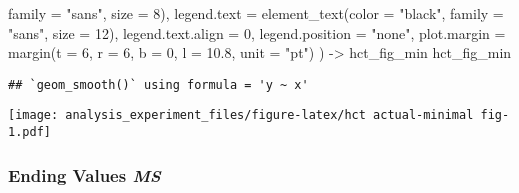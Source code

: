 \documentclass[
]{article}
\newenvironment{Shaded}{\begin{snugshade}}{\end{snugshade}}
\newcommand{\AttributeTok}[1]{\textcolor[rgb]{0.77,0.63,0.00}{#1}}
\newcommand{\DecValTok}[1]{\textcolor[rgb]{0.00,0.00,0.81}{#1}}
\newcommand{\FloatTok}[1]{\textcolor[rgb]{0.00,0.00,0.81}{#1}}
\newcommand{\FunctionTok}[1]{\textcolor[rgb]{0.00,0.00,0.00}{#1}}
\newcommand{\NormalTok}[1]{#1}
\newcommand{\OtherTok}[1]{\textcolor[rgb]{0.56,0.35,0.01}{#1}}
\newcommand{\StringTok}[1]{\textcolor[rgb]{0.31,0.60,0.02}{#1}}
\begin{document}
\begin{Shaded}
\begin{Highlighting}[]
                                 \AttributeTok{family =} \StringTok{"sans"}\NormalTok{, }
                                 \AttributeTok{size =} \DecValTok{8}\NormalTok{),}
        \AttributeTok{legend.text =} \FunctionTok{element\_text}\NormalTok{(}\AttributeTok{color =} \StringTok{"black"}\NormalTok{, }
                                 \AttributeTok{family =} \StringTok{"sans"}\NormalTok{, }
                                 \AttributeTok{size =} \DecValTok{12}\NormalTok{),}
        \AttributeTok{legend.text.align =} \DecValTok{0}\NormalTok{,}
        \AttributeTok{legend.position =} \StringTok{"none"}\NormalTok{,}
        \AttributeTok{plot.margin =} \FunctionTok{margin}\NormalTok{(}\AttributeTok{t =} \DecValTok{6}\NormalTok{, }\AttributeTok{r =} \DecValTok{6}\NormalTok{, }\AttributeTok{b =} \DecValTok{0}\NormalTok{, }\AttributeTok{l =} \FloatTok{10.8}\NormalTok{, }\AttributeTok{unit =} \StringTok{"pt"}\NormalTok{)}
\NormalTok{        ) }\OtherTok{{-}\textgreater{}}\NormalTok{ hct\_fig\_min}
\NormalTok{hct\_fig\_min}
\end{Highlighting}
\end{Shaded}

\begin{verbatim}
## `geom_smooth()` using formula = 'y ~ x'
\end{verbatim}

\texttt{[image: analysis\_experiment\_files/figure-latex/hct actual-minimal fig-1.pdf]}

\hypertarget{ending-values-ms-1}{%
\subsubsection{\texorpdfstring{Ending Values
\emph{MS}}{Ending Values MS}}\label{ending-values-ms-1}}
\end{document}
